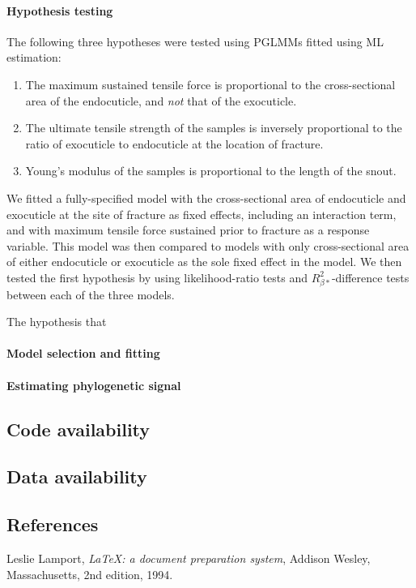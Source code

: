 \documentclass[twocolumn, linenumbers, superscriptaddress]{revtex4-1}
\begin{document}
			\paragraph*{Hypothesis testing}
				The following three hypotheses were tested using PGLMMs fitted using ML estimation:
				\begin{enumerate}
				\item The maximum sustained tensile force is proportional to the cross-sectional area of the endocuticle, and \emph{not} that of the exocuticle.
				\item The ultimate tensile strength of the samples is inversely proportional to the ratio of exocuticle to endocuticle at the location of fracture.
				\item Young's modulus of the samples is proportional to the length of the snout.
				\end{enumerate}
				
				We fitted a fully-specified model with the cross-sectional area of endocuticle and exocuticle at the site of fracture as fixed effects, including an interaction term, and with maximum tensile force sustained prior to fracture as a response variable.
				This model was then compared to models with only cross-sectional area of either endocuticle or exocuticle as the sole fixed effect in the model.
				We then tested the first hypothesis by using likelihood-ratio tests and $R^{2}_{\beta*}$-difference tests between each of the three models.
				
				The hypothesis that 
			
 
			\paragraph*{Model selection and fitting}
			
			\paragraph*{Estimating phylogenetic signal}
		
			
		\subsection*{Code availability}
			
		\subsection*{Data availability}

	\begin{thebibliography}{50}
		\section*{References}	
				Leslie Lamport,
				\textit{\LaTeX: a document preparation system},
				Addison Wesley, Massachusetts,
				2nd edition,
				1994.

	\end{thebibliography}
\end{document}

